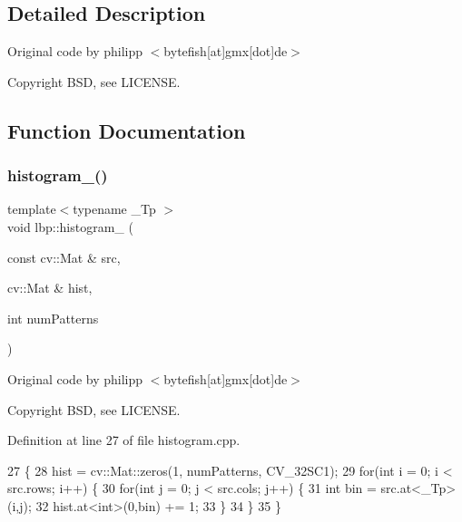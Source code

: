\subsection{Detailed Description}
Original code by philipp $<$bytefish\mbox{[}at\mbox{]}gmx\mbox{[}dot\mbox{]}de$>$ 

\begin{DoxyCopyright}{Copyright}
B\+SD, see L\+I\+C\+E\+N\+SE. 
\end{DoxyCopyright}


\subsection{Function Documentation}
\mbox{\label{namespacelbp_a7a2d45fdc785282bc110d25495ef78d7}} 
\subsubsection{\texorpdfstring{histogram\+\_\+()}{histogram\_()}}
{\footnotesize\ttfamily template$<$typename \+\_\+\+Tp $>$ \\
void lbp\+::histogram\+\_\+ (\begin{DoxyParamCaption}\item[{const cv\+::\+Mat \&}]{src,  }\item[{cv\+::\+Mat \&}]{hist,  }\item[{int}]{num\+Patterns }\end{DoxyParamCaption})}



Original code by philipp $<$bytefish\mbox{[}at\mbox{]}gmx\mbox{[}dot\mbox{]}de$>$ 

\begin{DoxyCopyright}{Copyright}
B\+SD, see L\+I\+C\+E\+N\+SE. 
\end{DoxyCopyright}


Definition at line 27 of file histogram.\+cpp.


\begin{DoxyCode}
27                                                                    \{
28     hist = cv::Mat::zeros(1, numPatterns, CV\_32SC1);
29     \textcolor{keywordflow}{for}(\textcolor{keywordtype}{int} i = 0; i < src.rows; i++) \{
30         \textcolor{keywordflow}{for}(\textcolor{keywordtype}{int} j = 0; j < src.cols; j++) \{
31             \textcolor{keywordtype}{int} bin = src.at<\_Tp>(i,j);
32             hist.at<\textcolor{keywordtype}{int}>(0,bin) += 1;
33         \}
34     \}
35 \}
\end{DoxyCode}
\mbox{\label{namespacelbp_a640337219aa7c2a5326fa41af8269cc5}} 
